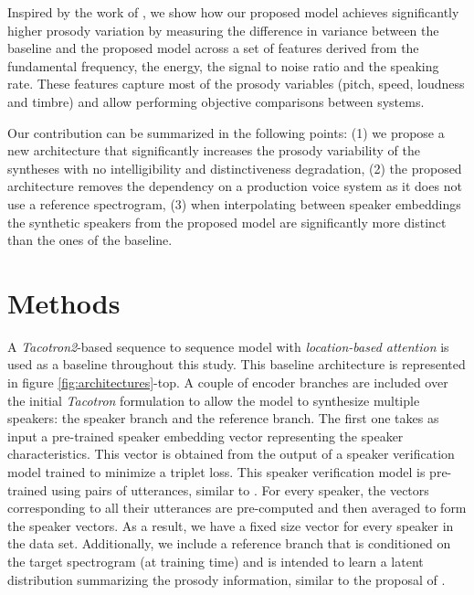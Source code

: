 Inspired by the work of \cite{Raitio2020}, we show how our proposed model achieves significantly higher prosody variation by measuring the difference in variance between the baseline and the proposed model across a set of features derived from the fundamental frequency, the energy, the signal to noise ratio and the speaking rate. These features capture most of the prosody variables (pitch, speed, loudness and timbre) \cite{Raitio2020} and allow performing objective comparisons between systems.

Our contribution can be summarized in the following points: (1) we propose a new architecture that significantly increases the prosody variability of the syntheses with no intelligibility and distinctiveness degradation, (2) the proposed architecture removes the dependency on a production voice system as it does not use a reference spectrogram, (3) when interpolating between speaker embeddings the synthetic speakers from the proposed model are significantly more distinct than the ones of the baseline.

\section{Methods}
A \textit{Tacotron2}-based sequence to sequence model with \textit{location-based attention} \cite{luong2015effective} is used as a baseline throughout this study. This baseline architecture is represented in figure \ref{fig:architectures}-top. A couple of encoder branches are included over the initial \textit{Tacotron} formulation to allow the model to synthesize multiple speakers: the speaker branch and the reference branch. The first one takes as input a pre-trained speaker embedding vector representing the speaker characteristics. This vector is obtained from the output of a speaker verification model trained to minimize a triplet loss. This speaker verification model is pre-trained using pairs of utterances, similar to  \cite{Ren2019}. For every speaker, the vectors corresponding to all their utterances are pre-computed and then averaged to form the speaker vectors. As a result, we have a fixed size vector for every speaker in the data set. Additionally, we include a reference branch that is conditioned on the target spectrogram (at training time) and is intended to learn a latent distribution summarizing the prosody information, similar to the proposal of \cite{skerryryan2018}.

